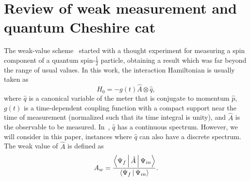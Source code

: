 \documentclass[aps,pra,showpacs,twoside,twocolumn,10pt]{revtex4-1}
\begin{document}
\section{Review of weak measurement and quantum Cheshire cat}
\label{section:2}
The weak-value scheme~\cite{AAV,Duck} started with a thought experiment for measuring a spin component of a quantum spin-$\frac{1}{2}$ particle, obtaining a result which was far beyond the range of usual values. In this work, the interaction Hamiltonian is usually taken as
\begin{equation}
\label{eqn:ho}
    H_0=-g(t)\hat{A}\otimes \hat{q},
\end{equation}
where $\hat{q}$ is a canonical variable of the meter that is conjugate to momentum $\hat{p}$, $g(t)$ is a time-dependent coupling function with a compact support near the time of  measurement (normalized such that its time integral is unity), and $\hat{A}$ is the 
observable to be measured. In~\cite{AAV,Duck}, $\hat{q}$ has a continuous spectrum. However, we will consider in this paper, instances where $\hat{q}$ can also have a discrete spectrum.
The weak value of $\hat{A}$ is defined as
\begin{equation}
    A_w = \frac{\Braket{\Psi_f|\hat{A}|\Psi_{in}}}{{\Braket{\Psi_f|\Psi_{in}}}}. 
\label{eq:weak}
\end{equation}
\end{document}
